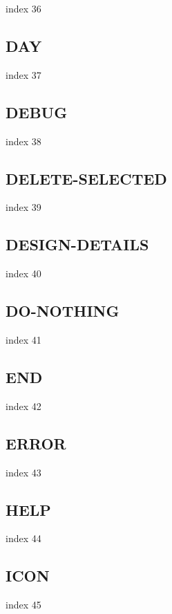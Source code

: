 \documentclass[a4paper]{report}
\begin{document}
index 36

\subsection{DAY}

index 37

\subsection{DEBUG}

index 38

\subsection{DELETE-SELECTED}

index 39

\subsection{DESIGN-DETAILS}

index 40

\subsection{DO-NOTHING}

index 41

\subsection{END}

index 42

\subsection{ERROR}

index 43

\subsection{HELP}

index 44

\subsection{ICON}

index 45
\end{document}
